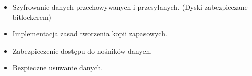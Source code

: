 \begin{itemize}
    \item Szyfrowanie danych przechowywanych i przesyłanych.
    (Dyski zabezpieczane bitlockerem) 
    \item Implementacja zasad tworzenia kopii zapasowych.
    \item Zabezpieczenie dostępu do nośników danych.
    \item Bezpieczne usuwanie danych.
\end{itemize}